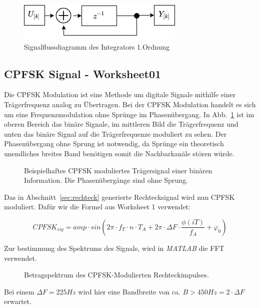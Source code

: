 \documentclass{article}
\begin{document}
\begin{figure}[!h]
    \centering
    \def\svgscale{0.3}
    \includegraphics{img/sig_IIR.png}
    \caption{Signalflussdiagramm des Integrators 1.Ordnung}
\end{figure}

\subsection{\ac{CPFSK} Signal - Worksheet01}

Die \ac{CPFSK} Modulation ist eine Methode um digitale Signale mithilfe einer Trägerfrequenz analog zu Übertragen.
Bei der \ac{CPFSK} Modulation handelt es sich um eine Frequenzmodulation ohne Sprünge im Phasenübergang. In Abb.~\ref{fsk}
ist im oberen Bereich das binäre Signale, im mittleren Bild die Trägerfrequenz und unten das binäre Signal auf die Trägerfrequenze
moduliert zu sehen. Der Phasenübergang ohne Sprung ist notwendig, da Sprünge ein theoretisch unendliches breites Band benötigen
somit die Nachbarkanäle stören würde.
\begin{figure}[!h]
    \centering

    \def\svgwidth{0.6\columnwidth}
    
    \caption{Beispielhaftes \ac{CPFSK} moduliertes Trägersignal einer binären 
    Information. Die Phasenübergänge sind ohne Sprung. }%
    \label{fsk}
\end{figure}

Das in Abschnitt~\ref{sec:rechteck} generierte Rechtecksignal wird nun \ac{CPFSK} moduliert.
Dafür wir die Formel aus Worksheet 1 verwendet:

$$CPFSK_{sig} = amp \cdot  sin(2  \pi \cdot f_T \cdot n \cdot T_A + 2 \pi \cdot \varDelta{F} \cdot \frac{\phi (iT)}{f_A} + \varphi_0) $$

Zur bestimmung des Spektrums des Signals, wird in \textit{MATLAB} die FFT verwendet.
\begin{figure}[!h]
    \centering
    \def\svgscale{0.3}
    \def\svgwidth{\columnwidth}
    
    \caption{Betragspektrum des \ac{CPFSK}-Modulierten Rechteckimpulses.}
\end{figure}
Bei einem $\varDelta F = 225Hz$ wird hier eine Bandbreite von ca. $B > 450Hz = 2\cdot \varDelta F $ erwartet.
\end{document}

